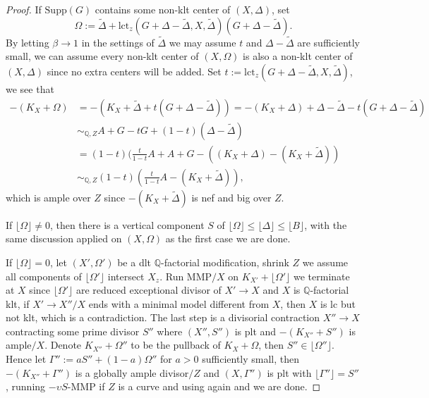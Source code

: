 \documentclass[10pt,a4paper]{amsart}
\begin{document}
\begin{proof}
    If $\text{Supp}(G)$ contains some non-klt center of $(X,\Delta)$, set \[\Omega:=\tilde\Delta+\text{lct}_z(G+\Delta-\tilde\Delta,X,\tilde\Delta) (G+\Delta-\tilde\Delta).\] By letting $\beta\to 1$ in the settings of $\tilde\Delta$ we may assume $t$ and $\Delta-\tilde\Delta$ are sufficiently small, we can assume every non-klt center of $(X,\Omega)$ is also a non-klt center of $(X,\Delta)$ since no extra centers will be added. Set $t:=\text{lct}_z(G+\Delta-\tilde\Delta,X,\tilde\Delta)$, we see that \[\begin{aligned}-(K_X+\Omega)&=-(K_X+\tilde\Delta+t(G+\Delta-\tilde\Delta))=-(K_X+\Delta)+\Delta-\tilde\Delta-t(G+\Delta-\tilde\Delta)\\&\sim_{{\mathbb Q},Z}A+G-tG+(1-t)(\Delta-\tilde\Delta)\\&=(1-t)(\frac{t}{1-t}A+A+G-((K_X+\Delta)-(K_X+\tilde\Delta))\\&\sim_{{\mathbb Q},Z}(1-t)(\frac{t}{1-t}A-(K_X+\tilde\Delta)),\end{aligned}\] which is ample over $Z$ since $-(K_X+\tilde\Delta)$ is nef and big over $Z$. 
    
    If $\lfloor \Omega\rfloor\neq 0$, then there is a vertical component $S$ of $\lfloor \Omega\rfloor\leq\lfloor\Delta\rfloor\leq\lfloor B\rfloor$, with the same discussion applied on $(X,\Omega)$ as the first case we are done. 
    
    If $\lfloor \Omega\rfloor=0$, let $(X',\Omega')$ be a dlt ${\mathbb Q}$-factorial modification, shrink $Z$ we assume all components of $\lfloor \Omega'\rfloor$ intersect $X_z$. Run MMP$/X$ on $K_{X'}+\lfloor\Omega'\rfloor$ we terminate at $X$ since $\lfloor \Omega'\rfloor$ are reduced exceptional divisor of $X'\to X$ and $X$ is ${\mathbb Q}$-factorial klt, if $X'\to X''/X$ ends with a minimal model different from $X$, then $X$ is lc but not klt, which is a contradiction. The last step is a divisorial contraction $X''\to X$ contracting some prime divisor $S''$ where $(X'',S'')$ is plt and $-(K_{X''}+S'')$ is ample$/X$. Denote $K_{X''}+\Omega''$ to be the pullback of $K_X+\Omega$, then $S''\in\lfloor\Omega''\rfloor$. Hence let $\Gamma'':=aS''+(1-a)\Omega''$ for $a>0$ sufficiently small, then $-(K_{X''}+\Gamma'')$ is a globally ample divisor$/Z$ and $(X,\Gamma'')$ is plt with $\lfloor \Gamma''\rfloor=S''$, running $-\upsilon S$-MMP if $Z$ is a curve and using  again and we are done.
\end{proof}
\end{document}
